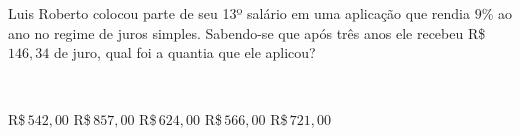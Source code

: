 \parbox{\linewidth}{

Luis Roberto colocou parte de seu 13º salário em uma aplicação que rendia $9$\% ao ano no regime de juros simples. Sabendo-se que após três anos ele recebeu R\$\,$146{,}34$ de juro, qual foi a quantia que ele aplicou?}\vspace{2mm}\\\parbox{\linewidth}{

R\$\,$542{,}00$
R\$\,$857{,}00$
R\$\,$624{,}00$
R\$\,$566{,}00$
R\$\,$721{,}00$

}

